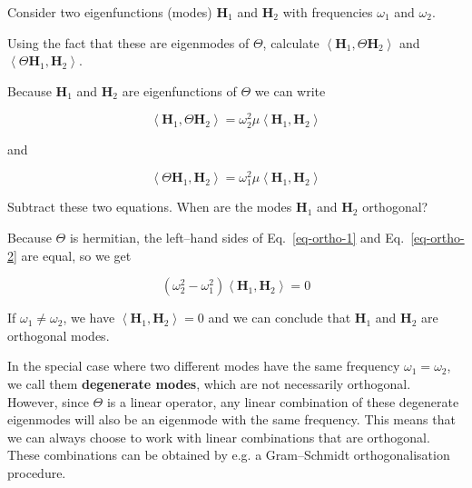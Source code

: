 \pagebreak


Consider two eigenfunctions (modes) ${\mathbf H}_1$ and ${\mathbf H}_2$ with frequencies $\omega_1$ and $\omega_2$.

\begin{cue}
Using the fact that these are eigenmodes of $\Theta$, calculate $\left\langle {\mathbf H}_1 , \Theta {\mathbf H}_2\right\rangle$ and $\left\langle \Theta {\mathbf H}_1 , {\mathbf H}_2\right\rangle$. 
\end{cue}
  
Because ${\mathbf H}_1$ and ${\mathbf H}_2$ are eigenfunctions of $\Theta$ we can write

\begin{equation}
 \left\langle {\mathbf H}_1 , \Theta {\mathbf H}_2\right\rangle = \omega_2^2 \mu \left\langle {\mathbf H}_1 , {\mathbf H}_2\right\rangle 
\label{eq-ortho-1}
\end{equation}

and

\begin{equation}
 \left\langle \Theta {\mathbf H}_1 , {\mathbf H}_2\right\rangle = \omega_1^2 \mu \left\langle {\mathbf H}_1 , {\mathbf H}_2\right\rangle
\label{eq-ortho-2}
\end{equation}

\begin{cue}
Subtract these two equations. When are the modes ${\mathbf H}_1$ and ${\mathbf H}_2$ orthogonal? 
\end{cue}

Because $\Theta$ is hermitian, the left--hand sides of Eq.~\ref{eq-ortho-1} and Eq.~\ref{eq-ortho-2} are equal, so we get

\begin{equation}
(\omega_2^2 - \omega_1^2) \left\langle {\mathbf H}_1 , {\mathbf H}_2\right\rangle = 0
\end{equation} 

If $\omega_1 \ne \omega_2$, we have $\left\langle {\mathbf H}_1 , {\mathbf H}_2\right\rangle = 0$ and we can conclude that ${\mathbf H}_1$ and ${\mathbf H}_2$ are orthogonal modes.

\noindent{}In the special case where two different modes have the same frequency $\omega_1 = \omega_2$, we call them \textbf{degenerate modes}, which are not necessarily orthogonal. However, since $\Theta$ is a linear operator, any linear combination of these degenerate eigenmodes will also be an eigenmode with the same frequency. This means that we can always choose to work with linear combinations that are orthogonal. These combinations can be obtained by e.g. a Gram--Schmidt orthogonalisation procedure.

